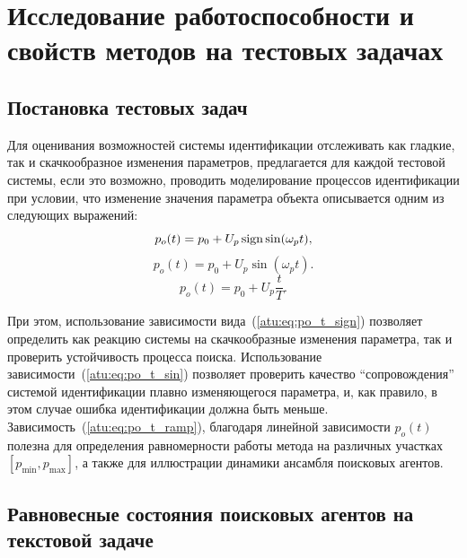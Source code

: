 




\section{Исследование работоспособности и свойств методов на тестовых задачах}  %

\subsection{Постановка тестовых задач}


Для оценивания возможностей системы идентификации
отслеживать как гладкие, так и скачкообразное изменения параметров,
предлагается для каждой тестовой системы, если это возможно,
проводить моделирование процессов идентификации при условии, что
изменение значения параметра объекта описывается одним из
следующих выражений:
%
\begin{equation}
  p_o(t) = p_0 +  U_{p} \operatorname*{sign} \sin( \omega_{p} t ),
  \label{atu:eq:po_t_sign}
\end{equation}
%
%
\begin{equation}
  p_o(t) = p_0 +  U_{p} \sin( \omega_{p} t ).
  \label{atu:eq:po_t_sin}
\end{equation}
%
\begin{equation}
  p_o(t) = p_0 +  U_{p} \frac{t}{T}.
  \label{atu:eq:po_t_ramp}
\end{equation}


При этом, использование зависимости вида~(\ref{atu:eq:po_t_sign})
позволяет определить как реакцию системы на скачкообразные
изменения параметра, так и проверить устойчивость процесса поиска.
Использование зависимости~(\ref{atu:eq:po_t_sin}) позволяет проверить
качество ``сопровождения'' системой идентификации плавно изменяющегося параметра,
и, как правило, в этом случае ошибка идентификации должна быть меньше.
Зависимость~(\ref{atu:eq:po_t_ramp}), благодаря линейной зависимости $p_o(t)$
полезна для определения
равномерности работы метода на различных участках $[p_{\min}, p_{\max}]$,
а также для иллюстрации динамики ансамбля поисковых агентов.



\subsection{Равновесные состояния поисковых агентов на текстовой задаче}  %

